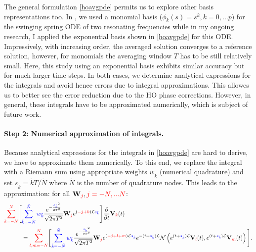 \documentclass[a4,12pt]{article}
\newcommand{\todo}[1]{\vspace{5 mm}\par \noindent
\framebox{\begin{minipage}[c]{0.95 \textwidth}
\tt #1 \end{minipage}}\vspace{5 mm}\par}
\newcommand{\inred}[1]{{\color{red}#1}}
\newcommand{\ingreen}[1]{{\color{blue}#1}}
\newcommand{\red}{\color{red}}
\newcommand{\pp}[2]{\frac{\partial #1}{\partial #2}}
\newcommand{\V}{\mathbf{V}}
\newcommand{\W}{\mathbf{W}}
\newcommand{\tN}{\tilde{N}}
\newcommand{\tk}{\tilde{k}}
\newcommand{\opL}{\mathcal{L}}
\newcommand{\opN}{\mathcal{N}}
\begin{document}
The general formulation \eqref{hoavgpde} permits us to explore other basis representations too. In \cite{Bauer22}, we used a monomial basis ($\phi_k(s) = s^k, k=0,...p$) for the swinging spring ODE of two resonating frequencies while in my ongoing research, I applied the exponential basis shown in \eqref{hoavgpde} for this ODE. Impressively, with increasing order, the averaged solution converges to a reference solution, however, for monomials the averaging window $T$ has to be still relatively small. Here, this study using an exponential basis exhibits similar accuracy but for much larger time steps. In both cases, we determine analytical expressions for the integrals and avoid hence errors due to integral approximations. This allowes us to better see the error reduction due to the HO phase corrections. However, in general, these integrals have to be approximated numerically, which is subject of future work.




\paragraph{Step 2: Numerical approximation of integrals.}

Because analytical expressions for the integrals in \eqref{hoavgpde} are hard to derive, we have to approximate them numerically. To this end, we replace the integral with a Riemann sum using appropriate weights \ingreen{$w_{\tk}$} (numerical quadrature) and set \ingreen{$s_{\tk} = \tk T/\tN$} where \ingreen{$\tN$} is the number of quadrature nodes. This leads to the approximation: for all $\W_\inred{j}, \inred{j = -N,...N}$:
\vspace{-0.75em}
\begin{align*}
\inred{\sum_{k=-N}^{N} }
\Bigg[
& \ingreen{\sum_{\tk=-\tN}^{\tN} w_{\tk}}
  \frac{e^{-\frac{\ingreen{s_{\tk}}^2}{2T^2}}}{\sqrt{2\pi T^2}}
  \W_\inred{j}  e^{(\inred{-j+k})\opL\ingreen{s_{\tk}}}
  \Bigg]
  \pp{}{t}  \V_\inred{k}(t) \\
 & = \inred{ \sum_{l,m =-N}^{N} }
 \Bigg[
 \ingreen{\sum_{\tk=-\tN}^{\tN} w_{\tk}}
     \frac{e^{-\frac{\ingreen{s_{\tk}}^2}{2T^2}}}{\sqrt{2\pi T^2}}
  \W_\inred{j} e^{(\inred{-j+l+m})\opL\ingreen{s_{\tk}}}
 e^{-(t+\ingreen{s_{\tk}}) \opL} \opN \left(e^{ (t+\ingreen{s_{\tk}}) \opL}  {\V_\inred{l}}(t), e^{ (t+\ingreen{s_{\tk}}) \opL} {\V_\inred{m}}(t)\right)   \Bigg].
 \end{align*}\vspace{-0.75em}
\end{document}
